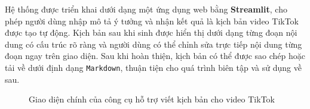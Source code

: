 Hệ thống được triển khai dưới dạng một ứng dụng web bằng \textbf{Streamlit}, cho phép người dùng nhập mô tả ý tưởng và nhận kết quả là kịch bản video TikTok được tạo tự động. Kịch bản sau khi sinh được hiển thị dưới dạng từng đoạn nội dung có cấu trúc rõ ràng và người dùng có thể chỉnh sửa trực tiếp nội dung từng đoạn ngay trên giao diện. Sau khi hoàn thiện, kịch bản có thể được sao chép hoặc tải về dưới định dạng \texttt{Markdown}, thuận tiện cho quá trình biên tập và sử dụng về sau.

\begin{figure}[H]
    \centering
    \caption{Giao diện chính của công cụ hỗ trợ viết kịch bản cho video TikTok}
    \label{fig:scriptwriting_main_page}
\end{figure}
